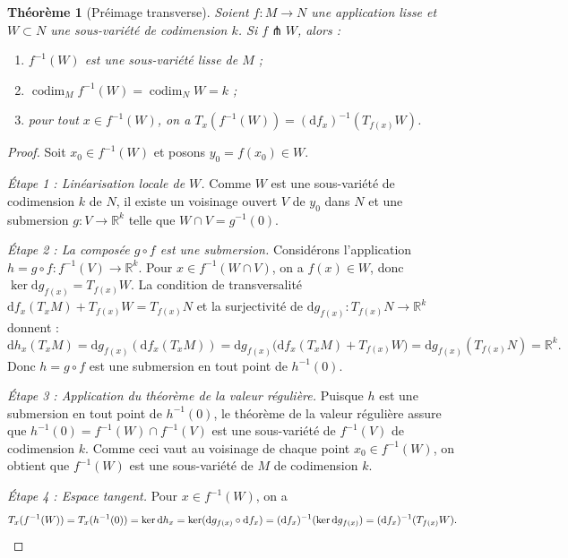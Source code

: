 \documentclass[12pt,a4paper,openany]{book}
\theoremstyle{definition}
\theoremstyle{plain}
\newtheorem{theoreme}[definition]{Théorème}
\theoremstyle{remark}
\newcommand{\R}{\mathbb{R}}
\newcommand{\dd}{\mathrm{d}}
\begin{document}
\begin{theoreme}[Préimage transverse]\label{thm:preimage-transverse}%
Soient $f \colon M \to N$ une application lisse et $W \subset N$ une
sous-variété de codimension $k$. Si $f \pitchfork W$, alors :
\begin{enumerate}[label=\textup{(\roman*)}]
  \item $f^{-1}(W)$ est une sous-variété lisse de $M$ ;
  \item $\operatorname{codim}_M f^{-1}(W) = \operatorname{codim}_N W = k$ ;
  \item pour tout $x \in f^{-1}(W)$, on a
    $T_x(f^{-1}(W)) = (\dd f_x)^{-1}(T_{f(x)} W)$.
\end{enumerate}
\end{theoreme}

\begin{proof}
Soit $x_0 \in f^{-1}(W)$ et posons $y_0 = f(x_0) \in W$.

\emph{Étape 1 : Linéarisation locale de $W$.}
Comme $W$ est une sous-variété de codimension $k$ de $N$, il existe un
voisinage ouvert $V$ de $y_0$ dans $N$ et une submersion
$g \colon V \to \R^k$ telle que $W \cap V = g^{-1}(0)$.

\emph{Étape 2 : La composée $g \circ f$ est une submersion.}
Considérons l'application $h = g \circ f \colon f^{-1}(V) \to \R^k$.
Pour $x \in f^{-1}(W \cap V)$, on a $f(x) \in W$, donc
$\ker \dd g_{f(x)} = T_{f(x)} W$. La condition de transversalité
$\dd f_x(T_x M) + T_{f(x)} W = T_{f(x)} N$ et la surjectivité de
$\dd g_{f(x)} \colon T_{f(x)} N \to \R^k$ donnent :
\[
  \dd h_x(T_x M) = \dd g_{f(x)}(\dd f_x(T_x M))
    = \dd g_{f(x)}\bigl(\dd f_x(T_x M) + T_{f(x)} W\bigr)
    = \dd g_{f(x)}(T_{f(x)} N) = \R^k.
\]
Donc $h = g \circ f$ est une submersion en tout point de $h^{-1}(0)$.

\emph{Étape 3 : Application du théorème de la valeur régulière.}
Puisque $h$ est une submersion en tout point de $h^{-1}(0)$, le théorème
de la valeur régulière assure que $h^{-1}(0) = f^{-1}(W) \cap f^{-1}(V)$
est une sous-variété de $f^{-1}(V)$ de codimension $k$. Comme ceci vaut
au voisinage de chaque point $x_0 \in f^{-1}(W)$, on obtient que
$f^{-1}(W)$ est une sous-variété de $M$ de codimension $k$.

\emph{Étape 4 : Espace tangent.}
Pour $x \in f^{-1}(W)$, on a
\[
  T_x(f^{-1}(W)) = T_x(h^{-1}(0)) = \ker \dd h_x
    = \ker(\dd g_{f(x)} \circ \dd f_x)
    = (\dd f_x)^{-1}(\ker \dd g_{f(x)})
    = (\dd f_x)^{-1}(T_{f(x)} W). \qedhere
\]
\end{proof}
\end{document}
